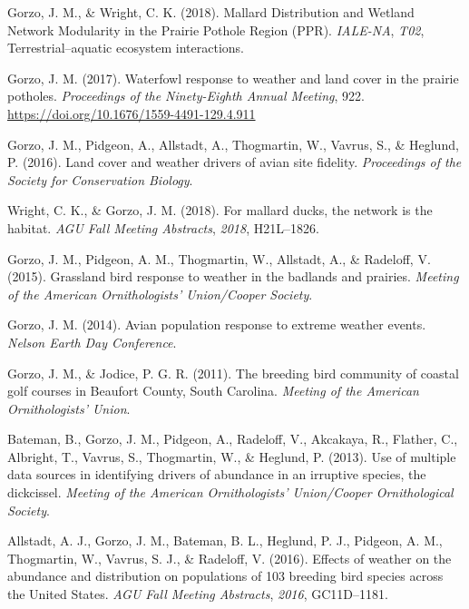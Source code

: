 \documentclass[11pt,a4paper,]{awesome-cv}
\newlength{\cslhangindent}
\newenvironment{CSLReferences}[2] %
 {\begin{list}{}{%
  \setlength{\itemindent}{0pt}
  \setlength{\leftmargin}{0pt}
  \setlength{\parsep}{0pt}
  \ifodd #1
   \setlength{\leftmargin}{\cslhangindent}
   \setlength{\itemindent}{-1\cslhangindent}
  \fi
  \setlength{\itemsep}{#2\baselineskip}}}
 {\end{list}}
\begin{document}
\label{refs-991d93bd90cb12ba09bf79627ab84edc}
\begin{CSLReferences}{1}{0}
Gorzo, J. M., \& Wright, C. K. (2018). Mallard Distribution and Wetland
Network Modularity in the Prairie Pothole Region (PPR). \emph{IALE-NA},
\emph{T02}, Terrestrial--aquatic ecosystem interactions.

Gorzo, J. M. (2017). Waterfowl response to weather and land cover in the
prairie potholes. \emph{Proceedings of the Ninety-Eighth Annual
Meeting}, 922. \url{https://doi.org/10.1676/1559-4491-129.4.911}

Gorzo, J. M., Pidgeon, A., Allstadt, A., Thogmartin, W., Vavrus, S., \&
Heglund, P. (2016). Land cover and weather drivers of avian site
fidelity. \emph{Proceedings of the Society for Conservation Biology}.

Wright, C. K., \& Gorzo, J. M. (2018). For mallard ducks, the network is
the habitat. \emph{AGU Fall Meeting Abstracts}, \emph{2018}, H21L--1826.

Gorzo, J. M., Pidgeon, A. M., Thogmartin, W., Allstadt, A., \& Radeloff,
V. (2015). Grassland bird response to weather in the badlands and
prairies. \emph{Meeting of the American Ornithologists' Union/Cooper
Society}.

Gorzo, J. M. (2014). Avian population response to extreme weather
events. \emph{Nelson Earth Day Conference}.

Gorzo, J. M., \& Jodice, P. G. R. (2011). The breeding bird community of
coastal golf courses in Beaufort County, South Carolina. \emph{Meeting
of the American Ornithologists' Union}.

Bateman, B., Gorzo, J. M., Pidgeon, A., Radeloff, V., Akcakaya, R.,
Flather, C., Albright, T., Vavrus, S., Thogmartin, W., \& Heglund, P.
(2013). Use of multiple data sources in identifying drivers of abundance
in an irruptive species, the dickcissel. \emph{Meeting of the American
Ornithologists' Union/Cooper Ornithological Society}.

Allstadt, A. J., Gorzo, J. M., Bateman, B. L., Heglund, P. J., Pidgeon,
A. M., Thogmartin, W., Vavrus, S. J., \& Radeloff, V. (2016). Effects of
weather on the abundance and distribution on populations of 103 breeding
bird species across the United States. \emph{AGU Fall Meeting
Abstracts}, \emph{2016}, GC11D--1181.

\end{CSLReferences}
\end{document}
